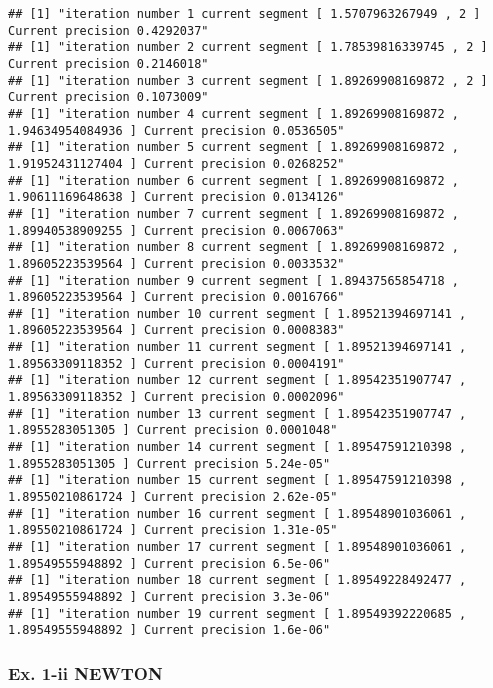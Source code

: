 \documentclass[
]{article}
\begin{document}
\begin{verbatim}
## [1] "iteration number 1 current segment [ 1.5707963267949 , 2 ] Current precision 0.4292037"
## [1] "iteration number 2 current segment [ 1.78539816339745 , 2 ] Current precision 0.2146018"
## [1] "iteration number 3 current segment [ 1.89269908169872 , 2 ] Current precision 0.1073009"
## [1] "iteration number 4 current segment [ 1.89269908169872 , 1.94634954084936 ] Current precision 0.0536505"
## [1] "iteration number 5 current segment [ 1.89269908169872 , 1.91952431127404 ] Current precision 0.0268252"
## [1] "iteration number 6 current segment [ 1.89269908169872 , 1.90611169648638 ] Current precision 0.0134126"
## [1] "iteration number 7 current segment [ 1.89269908169872 , 1.89940538909255 ] Current precision 0.0067063"
## [1] "iteration number 8 current segment [ 1.89269908169872 , 1.89605223539564 ] Current precision 0.0033532"
## [1] "iteration number 9 current segment [ 1.89437565854718 , 1.89605223539564 ] Current precision 0.0016766"
## [1] "iteration number 10 current segment [ 1.89521394697141 , 1.89605223539564 ] Current precision 0.0008383"
## [1] "iteration number 11 current segment [ 1.89521394697141 , 1.89563309118352 ] Current precision 0.0004191"
## [1] "iteration number 12 current segment [ 1.89542351907747 , 1.89563309118352 ] Current precision 0.0002096"
## [1] "iteration number 13 current segment [ 1.89542351907747 , 1.8955283051305 ] Current precision 0.0001048"
## [1] "iteration number 14 current segment [ 1.89547591210398 , 1.8955283051305 ] Current precision 5.24e-05"
## [1] "iteration number 15 current segment [ 1.89547591210398 , 1.89550210861724 ] Current precision 2.62e-05"
## [1] "iteration number 16 current segment [ 1.89548901036061 , 1.89550210861724 ] Current precision 1.31e-05"
## [1] "iteration number 17 current segment [ 1.89548901036061 , 1.89549555948892 ] Current precision 6.5e-06"
## [1] "iteration number 18 current segment [ 1.89549228492477 , 1.89549555948892 ] Current precision 3.3e-06"
## [1] "iteration number 19 current segment [ 1.89549392220685 , 1.89549555948892 ] Current precision 1.6e-06"
\end{verbatim}

\hypertarget{ex.-1-ii-newton}{%
\subsubsection{Ex. 1-ii NEWTON}\label{ex.-1-ii-newton}}
\end{document}
